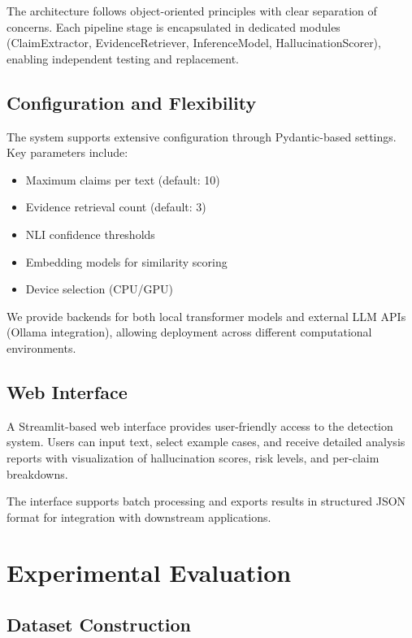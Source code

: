 \documentclass[conference]{IEEEtran}
\begin{document}
The architecture follows object-oriented principles with clear separation of concerns. Each pipeline stage is encapsulated in dedicated modules (ClaimExtractor, EvidenceRetriever, InferenceModel, HallucinationScorer), enabling independent testing and replacement.

\subsection{Configuration and Flexibility}

The system supports extensive configuration through Pydantic-based settings. Key parameters include:

\begin{itemize}
\item Maximum claims per text (default: 10)
\item Evidence retrieval count (default: 3)
\item NLI confidence thresholds
\item Embedding models for similarity scoring
\item Device selection (CPU/GPU)
\end{itemize}

We provide backends for both local transformer models and external LLM APIs (Ollama integration), allowing deployment across different computational environments.

\subsection{Web Interface}

A Streamlit-based web interface provides user-friendly access to the detection system. Users can input text, select example cases, and receive detailed analysis reports with visualization of hallucination scores, risk levels, and per-claim breakdowns.

The interface supports batch processing and exports results in structured JSON format for integration with downstream applications.

\section{Experimental Evaluation}

\subsection{Dataset Construction}
\end{document}
